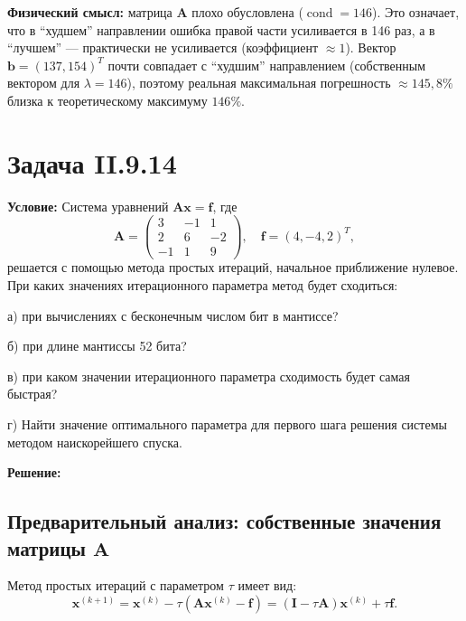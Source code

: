 \documentclass{article}
\begin{document}
\textbf{Физический смысл:} матрица $\mathbf{A}$ плохо обусловлена ($\operatorname{cond} = 146$). Это означает, что в ``худшем'' направлении ошибка правой части усиливается в 146 раз, а в ``лучшем'' --- практически не усиливается (коэффициент $\approx 1$). Вектор $\mathbf{b} = (137, 154)^T$ почти совпадает с ``худшим'' направлением (собственным вектором для $\lambda = 146$), поэтому реальная максимальная погрешность $\approx 145{,}8\%$ близка к теоретическому максимуму $146\%$.























\section*{Задача II.9.14}

\textbf{Условие:} Система уравнений $\mathbf{A}\mathbf{x} = \mathbf{f}$, где
$$\mathbf{A} = \begin{pmatrix} 3 & -1 & 1 \\ 2 & 6 & -2 \\ -1 & 1 & 9 \end{pmatrix}, \quad \mathbf{f} = (4, -4, 2)^T,$$
решается с помощью метода простых итераций, начальное приближение нулевое. При каких значениях итерационного параметра метод будет сходиться:

а) при вычислениях с бесконечным числом бит в мантиссе?

б) при длине мантиссы 52 бита?

в) при каком значении итерационного параметра сходимость будет самая быстрая?

г) Найти значение оптимального параметра для первого шага решения системы методом наискорейшего спуска.

\vspace{0.5cm}
\textbf{Решение:}

\subsection*{Предварительный анализ: собственные значения матрицы $\mathbf{A}$}

Метод простых итераций с параметром $\tau$ имеет вид:
\begin{equation}
\mathbf{x}^{(k+1)} = \mathbf{x}^{(k)} - \tau(\mathbf{A}\mathbf{x}^{(k)} - \mathbf{f}) = (\mathbf{I} - \tau\mathbf{A})\mathbf{x}^{(k)} + \tau\mathbf{f}.
\end{equation}
\end{document}
